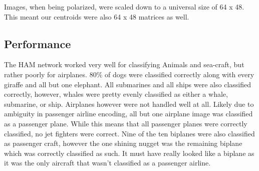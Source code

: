 \documentclass{article}
\begin{document}
Images, when being polarized, were scaled down to a universal size of 64 x 48. This meant our centroids were also 64 x 48 matrices as well.

\subsection{Performance}
The HAM network worked very well for classifying Animals and sea-craft, but rather poorly for airplanes.  80\% of dogs were classified correctly along with every giraffe and all but one elephant.  All submarines and all ships were also classified correctly, however, whales were pretty evenly classified as either a whale, submarine, or ship.  Airplanes however were not handled well at all.  Likely due to ambiguity in passenger airline encoding, all but one airplane image was classified as a passenger plane.  While this means that all passenger planes were correctly classified, no jet fighters were correct.  Nine of the ten biplanes were also classified as passenger craft, however the one shining nugget was the remaining biplane which was correctly classified as such.  It must have really looked like a biplane as it was the only aircraft that wasn't classified as a passenger airline.
\end{document}
